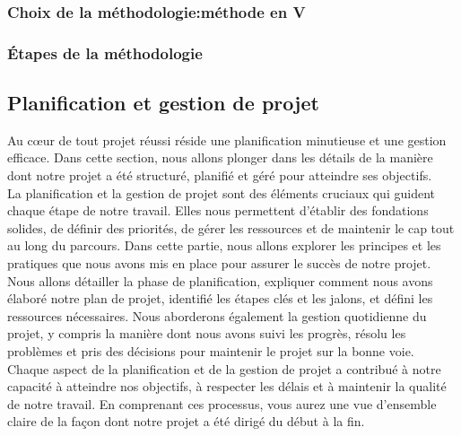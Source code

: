 \documentclass[a4paper, 12pt, french]{article}
\begin{document}
				\subsubsection{Choix de la méthodologie:méthode en V}

				\subsubsection{Étapes de la méthodologie}
			
			
			\subsection{Planification et gestion de projet}
				Au cœur de tout projet réussi réside une planification minutieuse et une gestion efficace. Dans cette section, nous allons plonger dans les détails de la manière dont notre projet a été structuré, planifié et géré pour atteindre ses objectifs.\\

				La planification et la gestion de projet sont des éléments cruciaux qui guident chaque étape de notre travail. Elles nous permettent d'établir des fondations solides, de définir des priorités, de gérer les ressources et de maintenir le cap tout au long du parcours. Dans cette partie, nous allons explorer les principes et les pratiques que nous avons mis en place pour assurer le succès de notre projet.\\

				Nous allons détailler la phase de planification, expliquer comment nous avons élaboré notre plan de projet, identifié les étapes clés et les jalons, et défini les ressources nécessaires. Nous aborderons également la gestion quotidienne du projet, y compris la manière dont nous avons suivi les progrès, résolu les problèmes et pris des décisions pour maintenir le projet sur la bonne voie.\\

				Chaque aspect de la planification et de la gestion de projet a contribué à notre capacité à atteindre nos objectifs, à respecter les délais et à maintenir la qualité de notre travail. En comprenant ces processus, vous aurez une vue d'ensemble claire de la façon dont notre projet a été dirigé du début à la fin.\\
\end{document}
